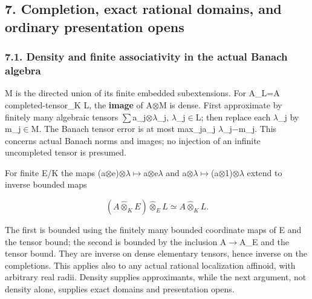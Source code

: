 \documentclass[
  10pt,
]{article}
\begin{document}
\subsection{7. Completion, exact rational domains, and ordinary
presentation
opens}\label{completion-exact-rational-domains-and-ordinary-presentation-opens}

\subsubsection{7.1. Density and finite associativity in the actual
Banach
algebra}\label{density-and-finite-associativity-in-the-actual-banach-algebra}

M is the directed union of its finite embedded subextensions. For A\_L=A
completed-tensor\_K L, the \textbf{image} of A\ensuremath{\otimes}M is dense. First
approximate by finitely many algebraic tensors \ensuremath{\sum}a\_j\ensuremath{\otimes}\ensuremath{\lambda}\_j, \ensuremath{\lambda}\_j\ensuremath{\in}L; then
replace each \ensuremath{\lambda}\_j by m\_j\ensuremath{\in}M. The Banach tensor error is at most
max\_j\textbar\textbar a\_j\textbar\textbar{}
\textbar \ensuremath{\lambda}\_j\ensuremath{-}m\_j\textbar. This concerns actual Banach norms and
images; no injection of an infinite uncompleted tensor is presumed.

For finite E/K the maps (a\ensuremath{\otimes}e)\ensuremath{\otimes}\ensuremath{\lambda}\ensuremath{\mapsto}a\ensuremath{\otimes}e\ensuremath{\lambda} and a\ensuremath{\otimes}\ensuremath{\lambda}\ensuremath{\mapsto}(a\ensuremath{\otimes}1)\ensuremath{\otimes}\ensuremath{\lambda} extend to inverse
bounded maps

\[
        (A\widehat\otimes_K E)\widehat\otimes_E L
                          \simeq A\widehat\otimes_K L.      \tag{14}
\]

The first is bounded using the finitely many bounded coordinate maps of
E and the tensor bound; the second is bounded by the inclusion A\ensuremath{\to}A\_E
and the tensor bound. They are inverse on dense elementary tensors,
hence inverse on the completions. This applies also to any actual
rational localization affinoid, with arbitrary real radii. Density
supplies approximants, while the next argument, not density alone,
supplies exact domains and presentation opens.
\end{document}
